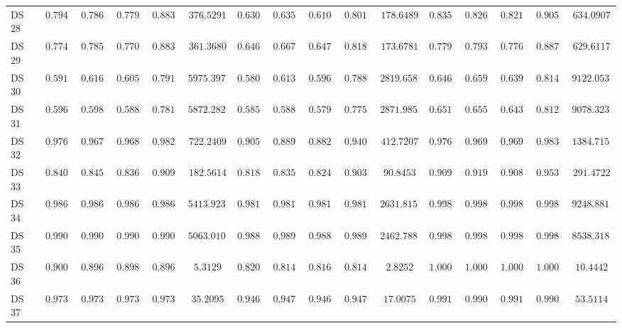 {\begin{longtable}{|l|ccccc|ccccc|ccccc|}
		DS 28 & $0.7949$ & $0.7864$ & $0.7790$ & $0.8835$ & $376.5291$ & $0.6308$ & $0.6354$ & $0.6106$ & $0.8011$ & $178.6489$ & $\boldsymbol{0.8359}$ & $\boldsymbol{0.8260}$ & $\boldsymbol{0.8219}$ & $\boldsymbol{0.9051}$ & $634.0907$ \\
		DS 29 & $0.7744$ & $0.7858$ & $0.7708$ & $0.8832$ & $361.3680$ & $0.6462$ & $0.6675$ & $0.6474$ & $0.8186$ & $173.6781$ & $\boldsymbol{0.7795}$ & $\boldsymbol{0.7937}$ & $\boldsymbol{0.7765}$ & $\boldsymbol{0.8875}$ & $629.6117$ \\
		DS 30 & $0.5912$ & $0.6169$ & $0.6053$ & $0.7911$ & $5975.3979$ & $0.5801$ & $0.6130$ & $0.5967$ & $0.7889$ & $2819.6584$ & $\boldsymbol{0.6464}$ & $\boldsymbol{0.6593}$ & $\boldsymbol{0.6392}$ & $\boldsymbol{0.8142}$ & $9122.0530$ \\
		DS 31 & $0.5967$ & $0.5988$ & $0.5888$ & $0.7812$ & $5872.2820$ & $0.5856$ & $0.5883$ & $0.5792$ & $0.7754$ & $2871.9854$ & $\boldsymbol{0.6519}$ & $\boldsymbol{0.6559}$ & $\boldsymbol{0.6433}$ & $\boldsymbol{0.8123}$ & $9078.3235$ \\
		DS 32 & $0.9769$ & $0.9678$ & $0.9683$ & $0.9827$ & $722.2409$ & $0.9059$ & $0.8893$ & $0.8829$ & $0.9404$ & $412.7207$ & $\boldsymbol{0.9769}$ & $\boldsymbol{0.9699}$ & $\boldsymbol{0.9694}$ & $\boldsymbol{0.9838}$ & $1384.7153$ \\
		DS 33 & $0.8409$ & $0.8454$ & $0.8369$ & $0.9098$ & $182.5614$ & $0.8182$ & $0.8351$ & $0.8247$ & $0.9038$ & $90.8453$ & $\boldsymbol{0.9091}$ & $\boldsymbol{0.9195}$ & $\boldsymbol{0.9088}$ & $\boldsymbol{0.9531}$ & $291.4722$ \\
		DS 34 & $0.9867$ & $0.9866$ & $0.9867$ & $0.9866$ & $5413.9235$ & $0.9813$ & $0.9811$ & $0.9813$ & $0.9811$ & $2631.8152$ & $\boldsymbol{0.9987}$ & $\boldsymbol{0.9986}$ & $\boldsymbol{0.9987}$ & $\boldsymbol{0.9986}$ & $9248.8818$ \\
		DS 35 & $0.9903$ & $0.9903$ & $0.9903$ & $0.9903$ & $5063.0107$ & $0.9889$ & $0.9891$ & $0.9889$ & $0.9891$ & $2462.7886$ & $\boldsymbol{0.9986}$ & $\boldsymbol{0.9986}$ & $\boldsymbol{0.9986}$ & $\boldsymbol{0.9986}$ & $8538.3186$ \\
		DS 36 & $0.9000$ & $0.8961$ & $0.8980$ & $0.8961$ & $5.3129$ & $0.8200$ & $0.8149$ & $0.8164$ & $0.8149$ & $2.8252$ & $\boldsymbol{1.0000}$ & $\boldsymbol{1.0000}$ & $\boldsymbol{1.0000}$ & $\boldsymbol{1.0000}$ & $10.4442$ \\
		DS 37 & $0.9735$ & $0.9737$ & $0.9734$ & $0.9737$ & $35.2095$ & $0.9469$ & $0.9473$ & $0.9469$ & $0.9473$ & $17.0075$ & $\boldsymbol{0.9912}$ & $\boldsymbol{0.9909}$ & $\boldsymbol{0.9911}$ & $\boldsymbol{0.9909}$ & $53.5114$ \\

\end{longtable}}
